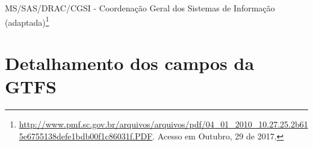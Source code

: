 \documentclass[
	12pt,				%
	oneside,			%
	a4paper,			%
	english,			%
	brazil				%
	]{abntex2ppgsi}
\begin{document}
{{\begin{apendicesenv}
\begin{longtable}{c|c}
\end{longtable}

 MS/SAS/DRAC/CGSI - Coordenação Geral dos Sistemas de Informação (adaptada)\footnote{\url{http://www.pmf.sc.gov.br/arquivos/arquivos/pdf/04_01_2010_10.27.25.2b615e6755138defe1bdb00f1c86031f.PDF}. Acesso em Outubro, 29 de 2017.}

\clearpage


%
%
%
\chapter{Detalhamento dos campos da GTFS}
\label{apendiceC}




\end{apendicesenv}}}
\end{document}
